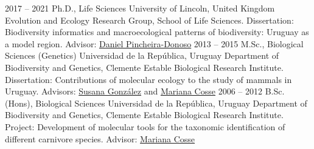 \documentclass[9pt]{developercv} %
\begin{document}


\begin{entrylist}
	\entry
		{2017 -- 2021}
		{Ph.D., Life Sciences}
		{University of Lincoln, United Kingdom}
		{Evolution and Ecology Research Group, School of Life Sciences. Dissertation: Biodiversity informatics and macroecological patterns of biodiversity: Uruguay as a model region. Advisor: \href{http://selectiondynamics.weebly.com/daniel-pincheira-donoso.html}{Daniel Pincheira-Donoso}}
	\entry
		{2013 -- 2015}
		{M.Sc., Biological Sciences (Genetics)}
		{Universidad de la Rep\'{u}blica, Uruguay}
		{Department of Biodiversity and Genetics, Clemente Estable Biological Research Institute. Dissertation: Contributions of molecular ecology to the study of mammals in Uruguay. Advisors: \href{https://scholar.google.com.uy/citations?user=FSrtqaMAAAAJ&hl=en}{Susana González} and \href{https://scholar.google.com/citations?user=uWh1ONQAAAAJ&hl=es}{Mariana Cosse}}
	\entry
		{2006 -- 2012}
		{B.Sc. (Hons), Biological Sciences}
		{Universidad de la Rep\'{u}blica, Uruguay}
		{Department of Biodiversity and Genetics, Clemente Estable Biological Research Institute. Project: Development of molecular tools for the taxonomic identification of different carnivore species. Advisor: \href{https://scholar.google.com/citations?user=uWh1ONQAAAAJ&hl=es}{Mariana Cosse}}
\end{entrylist}


\end{document}
